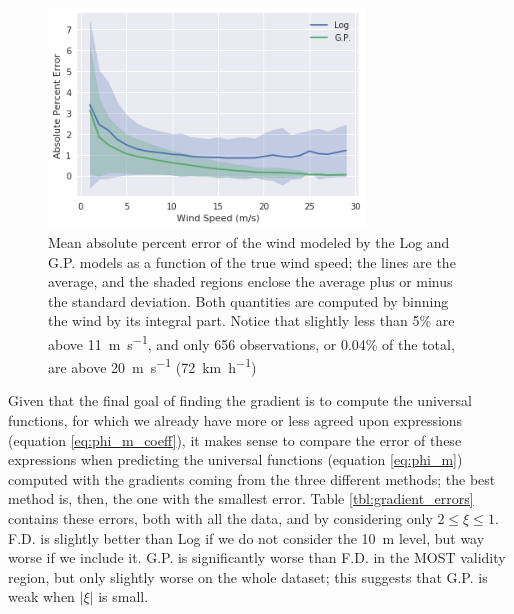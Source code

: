 \documentclass[12pt]{book}
\begin{document}
\begin{figure}
    \centering
	\includegraphics[width=0.75\textwidth]{images/gp_log_perc_err_wind_speed}
	\caption{Mean absolute percent error of the wind modeled by the Log and G.P. models as a function of the true wind speed; the lines are the average, and the shaded regions enclose the average plus or minus the standard deviation. Both quantities are computed by binning the wind by its integral part. Notice that slightly less than 5\% are above \SI{11}{\meter\per\second}, and only 656 observations, or 0.04\% of the total, are above \SI{20}{\meter\per\second} (\SI{72}{\kilo\meter\per\hour})}
	\label{fig:gp_log_perc_err_wind_speed}
\end{figure}


Given that the final goal of finding the gradient is to compute the universal functions, for which we already have more or less agreed upon expressions (equation \ref{eq:phi_m_coeff}), it makes sense to compare the error of these expressions when predicting the universal functions (equation \ref{eq:phi_m}) computed with the gradients coming from the three different methods; the best method is, then, the one with the smallest error. Table \ref{tbl:gradient_errors} contains these errors, both with all the data, and by considering only $2\leq\xi\leq 1$. F.D. is slightly better than Log if we do not consider the \SI{10}{\meter} level, but way worse if we include it. G.P. is significantly worse than F.D. in the MOST validity region, but only slightly worse on the whole dataset; this suggests that G.P. is weak when $\vert\xi\vert$ is small. 
\end{document}
